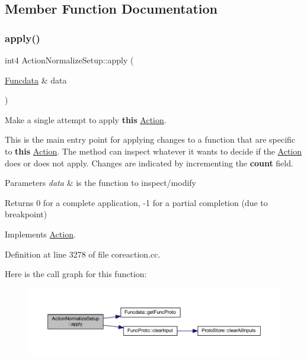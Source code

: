 \subsection{Member Function Documentation}
\mbox{\label{class_action_normalize_setup_a399c4047a0cb042e54daba9d02e86b15}} 
\subsubsection{\texorpdfstring{apply()}{apply()}}
{\footnotesize\ttfamily int4 Action\+Normalize\+Setup\+::apply (\begin{DoxyParamCaption}\item[{\mbox{\hyperlink{class_funcdata}{Funcdata}} \&}]{data }\end{DoxyParamCaption})\hspace{0.3cm}{\ttfamily [virtual]}}



Make a single attempt to apply {\bfseries{this}} \mbox{\hyperlink{class_action}{Action}}. 

This is the main entry point for applying changes to a function that are specific to {\bfseries{this}} \mbox{\hyperlink{class_action}{Action}}. The method can inspect whatever it wants to decide if the \mbox{\hyperlink{class_action}{Action}} does or does not apply. Changes are indicated by incrementing the {\bfseries{count}} field. 
\begin{DoxyParams}{Parameters}
{\em data} & is the function to inspect/modify \\
\hline
\end{DoxyParams}
\begin{DoxyReturn}{Returns}
0 for a complete application, -\/1 for a partial completion (due to breakpoint) 
\end{DoxyReturn}


Implements \mbox{\hyperlink{class_action_aac1c3999d6c685b15f5d9765a4d04173}{Action}}.



Definition at line 3278 of file coreaction.\+cc.

Here is the call graph for this function\+:
\nopagebreak
\begin{figure}[H]
\begin{center}
\leavevmode
\includegraphics[width=350pt]{class_action_normalize_setup_a399c4047a0cb042e54daba9d02e86b15_cgraph}
\end{center}
\end{figure}
\mbox{\label{class_action_normalize_setup_a2c000f58b714f940cfab12142a0b294f}} 
